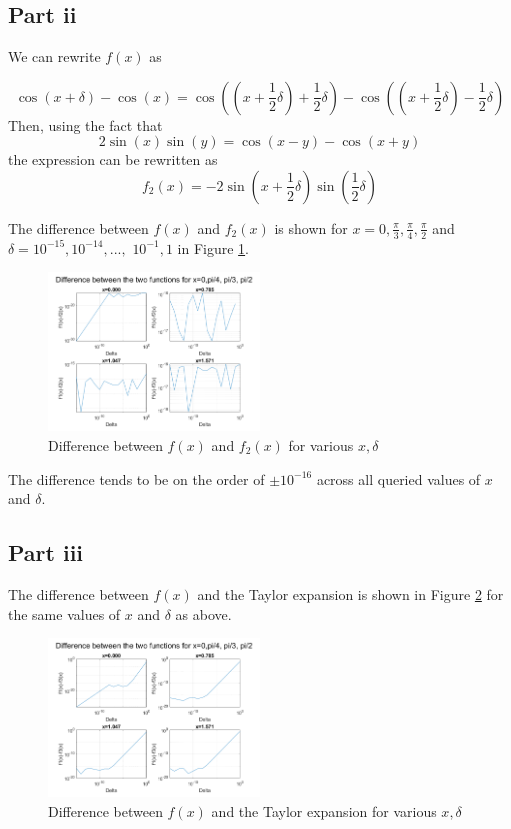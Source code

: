 \documentclass[12pt]{exam}
\begin{document}
\subsection*{Part ii}
We  can rewrite $f(x)$ as

\begin{equation}
\cos(x+\delta)-\cos(x)=\cos \left( \left(x+\frac{1}{2}\delta \right)+\frac{1}{2}\delta\right)-\cos\left(\left(x+\frac{1}{2}\delta\right)-\frac{1}{2}\delta\right)
\end{equation}
Then, using the fact that
\begin{equation}
2\sin(x)\sin(y)=\cos(x-y)-\cos(x+y)
\end{equation} 
the expression can be rewritten as 
\begin{equation}
f_2(x)=-2\sin\left( x+\frac{1}{2}\delta \right)\sin \left(\frac{1}{2}\delta\right)
\end{equation}

The difference between $f(x)$ and $f_2(x)$ is shown for $x=0,\frac{\pi}{3}, \frac{\pi}{4}, \frac{\pi}{2}$ and $\delta = 10^{-15}, 10^{-14},...,$ $10^{-1}, 1$ in Figure \ref{fig:fminusf2}.

\begin{figure}[h!]
\centering
\includegraphics[width=0.5\textwidth]{q3p2.png}
\caption{Difference between $f(x)$ and $f_2(x)$ for various $x,\delta$}\label{fig:fminusf2}
\end{figure}
The difference tends to be on the order of $\pm 10^{-16}$ across all queried values of $x$ and $\delta$. 

\subsection*{Part iii}

The difference between $f(x)$ and the Taylor expansion is shown in Figure \ref{fig:fminusTaylor} for the same values of $x$ and $\delta$ as above. 
\begin{figure}[h!]
\centering
\includegraphics[width=0.5\textwidth]{q3p3.png}
\caption{Difference between $f(x)$ and the Taylor expansion for various $x,\delta$}\label{fig:fminusTaylor}
\end{figure}
\end{document}
